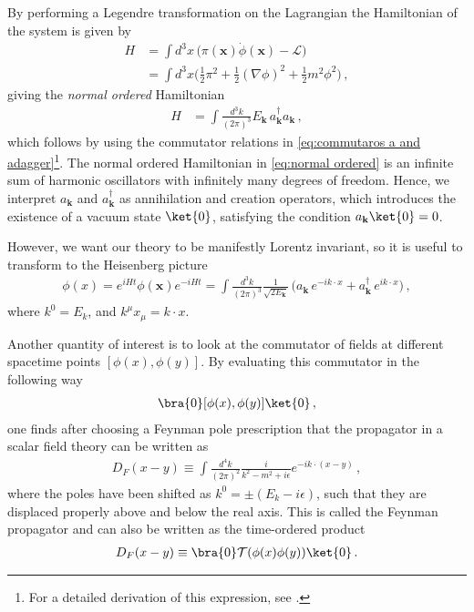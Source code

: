 By performing a Legendre transformation on the Lagrangian the Hamiltonian of the system is given by
\begin{align}
    H&=\int d^{3}x\,\big(\pi(\mathbf{x})\dot{\phi}(\mathbf{x})-\mathcal{L}\big)\nonumber
    \\
    &=\int d^{3}x\big(\frac{1}{2}\pi^{2}+\frac{1}{2}(\nabla\phi)^{2}+\frac{1}{2}m^{2}\phi^{2}\big)\,,
\end{align}
giving the \emph{normal ordered} Hamiltonian
\begin{align}\label{eq:normal ordered}
    H&=\int\frac{d^{3}k}{(2\pi)^{3}}E_{\mathbf{k}}\,a_{\mathbf{k}}^{\dagger}a_{\mathbf{k}}\,,
\end{align}
which follows by using the commutator relations in \cref{eq:commutaros a and adagger}\footnote{For a detailed derivation of this expression, see \cite{Peskin:257493}.}. The normal ordered Hamiltonian in \cref{eq:normal ordered} is an infinite sum of harmonic oscillators with infinitely many degrees of freedom. Hence, we interpret $a_{\mathbf{k}}$ and $a_{\mathbf{k}}^{\dagger}$
as annihilation and creation operators, which introduces the existence of a vacuum state $\ket{0}$, satisfying the condition $a_{\mathbf{k}}\ket{0}=0$.



However, we want our theory to be manifestly Lorentz invariant, so it is useful to transform to the Heisenberg picture
\begin{align}
    \phi(x)=e^{iHt}\phi(\mathbf{x})e^{-iHt}=\int \frac{d^{3}k}{(2\pi)^{3}}\frac{1}{\sqrt{2E_{\mathbf{k}}}}\,\big(a_{\mathbf{k}}\,e^{-ik\cdot x}+a^{\dagger}_{\mathbf{k}}\,e^{ik\cdot x}\big)\,,
\end{align}
where $k^{0}=E_{k}$, and $k^{\mu}x_{\mu}=k\cdot x$. 

Another quantity of interest is to look at the commutator of fields at different spacetime points $[\phi(x),\phi(y)]$. By evaluating this commutator in the following way
\begin{align}
    \bra{0}[\phi(x),\phi(y)]\ket{0}\,,
\end{align}
one finds after choosing a Feynman pole prescription that the propagator in a scalar field theory can be written as
\begin{align}\label{eq:integral rep Fprop}
    D_{F}(x-y)\equiv\int\frac{d^{4}k}{(2\pi)^{2}}\frac{i}{k^{2}-m^{2}+i\epsilon}e^{-ik\cdot(x-y)}\,,
\end{align}
where the poles have been shifted as $k^{0}=\pm(E_{k}-i\epsilon)$, such that they are displaced properly above and below the real axis. This is called the Feynman propagator and can also be written as the time-ordered product
\begin{align}\label{eq:feynman propagator scalar}
    D_{F}(x-y)\equiv\bra{0} \mathcal{T}(\phi(x)\phi(y))\ket{0}\,.
\end{align}

